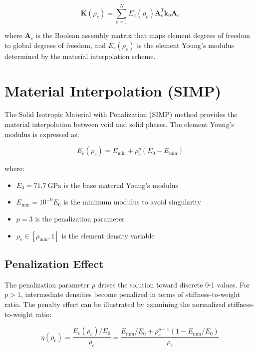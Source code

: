 \documentclass[11pt]{report}
\newcommand{\matr}[1]{\mathbf{#1}}
\newcommand{\rhoe}{\rho_e}
\newcommand{\rhomin}{\rho_{\text{min}}}
\newcommand{\youngs}{E}
\newcommand{\youngszero}{\youngs_0}
\newcommand{\penalty}{p}
\newcommand{\stiffmat}{\matr{K}}
\newcommand{\elemstiff}{\matr{k}_0}
\begin{document}
\begin{equation}
\stiffmat(\rhoe) = \sum_{e=1}^{N} \youngs_e(\rhoe) \matr{A}_e^T \elemstiff \matr{A}_e
\end{equation}

where $\matr{A}_e$ is the Boolean assembly matrix that maps element degrees of freedom to global degrees of freedom, and $\youngs_e(\rhoe)$ is the element Young's modulus determined by the material interpolation scheme.

\section{Material Interpolation (SIMP)}
The Solid Isotropic Material with Penalization (SIMP) method provides the material interpolation between void and solid phases. The element Young's modulus is expressed as:

\begin{equation}
\youngs_e(\rhoe) = \youngs_{\text{min}} + \rhoe^{\penalty}(\youngszero - \youngs_{\text{min}})
\end{equation}

where:
\begin{itemize}
    \item $\youngszero = \SI{71.7}{\giga\pascal}$ is the base material Young's modulus
    \item $\youngs_{\text{min}} = 10^{-9} \youngszero$ is the minimum modulus to avoid singularity
    \item $\penalty = 3$ is the penalization parameter
    \item $\rhoe \in [\rhomin, 1]$ is the element density variable
\end{itemize}

\subsection{Penalization Effect}
The penalization parameter $\penalty$ drives the solution toward discrete 0-1 values. For $\penalty > 1$, intermediate densities become penalized in terms of stiffness-to-weight ratio. The penalty effect can be illustrated by examining the normalized stiffness-to-weight ratio:

\begin{equation}
\eta(\rhoe) = \frac{\youngs_e(\rhoe)/\youngszero}{\rhoe} = \frac{\youngs_{\text{min}}/\youngszero + \rhoe^{\penalty-1}(1 - \youngs_{\text{min}}/\youngszero)}{\rhoe}
\end{equation}
\end{document}

